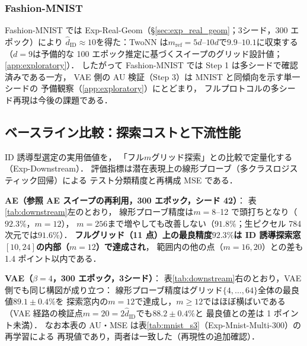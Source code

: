 \documentclass[11pt,a4paper]{jsarticle}
\newcommand{\hatdID}{\hat{d}_{\mathrm{ID}}}
\begin{document}
\subsubsection{Fashion-MNIST}

Fashion-MNIST では Exp-Real-Geom（§\ref{sec:exp_real_geom}；3シード，300 エポック）により
$\hatdID \approx 10$を得た：TwoNN は$m_{\mathrm{ref}} = 5d$--$10d$で$9.9$--$10.1$に収束する
（$d = 9$は予備的な 100 エポック推定に基づくスイープのグリッド設計値；\ref{app:exploratory}）．
したがって Fashion-MNIST では Step 1 は多シードで確認済みである一方，
VAE 側の AU 検証（Step 3）は MNIST と同傾向を示す単一シードの
予備観察（\ref{app:exploratory}）にとどまり，
フルプロトコルの多シード再現は今後の課題である．

\subsection{ベースライン比較：探索コストと下流性能}\label{sec:exp_downstream}

ID 誘導型選定の実用価値を，
「フル$m$グリッド探索」との比較で定量化する（Exp-Downstream）．
評価指標は潜在表現上の線形プローブ（多クラスロジスティック回帰）による
テスト分類精度と再構成 MSE である．

\textbf{AE（参照 AE スイープの再利用，300 エポック，シード 42）}：
表\ref{tab:downstream}左のとおり，
線形プローブ精度は$m = 8$--12 で頭打ちとなり（$92.3\%$，$m = 12$），
$m = 256$まで増やしても改善しない（$91.8\%$；生ピクセル 784 次元では$91.6\%$）．
\textbf{フルグリッド（11 点）上の最良精度$92.3\%$は
ID 誘導探索窓$[10, 24]$の内部（$m = 12$）で達成され}，
範囲内の他の点（$m = 16, 20$）との差も 1.4 ポイント以内である．

\textbf{VAE（$\beta = 4$，300 エポック，3シード）}：
表\ref{tab:downstream}右のとおり，VAE 側でも同じ構図が成り立つ：
線形プローブ精度はグリッド$\{4, \ldots, 64\}$全体の最良値$89.1 \pm 0.4\%$を
探索窓内の$m = 12$で達成し，$m \geq 12$ではほぼ横ばいである
（VAE 経路の検証点$m = 20 = 2\hatdID$でも$88.2 \pm 0.4\%$と
最良値との差は 1 ポイント未満）．
なお本表の AU・MSE は表\ref{tab:mnist_s3}（Exp-Mnist-Multi-300）の再学習による
再現値であり，両者は一致した（再現性の追加確認）．
\end{document}
